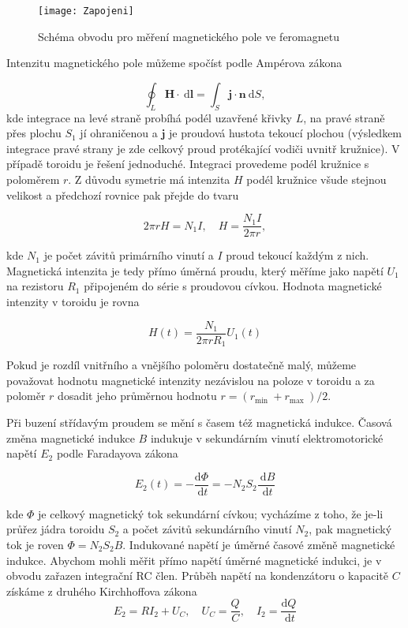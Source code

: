 \documentclass[czech,11pt,a4paper]{article}
\begin{document}
\begin{multicols}{2}
\begin{figure}[H]
\begin{center}
			\texttt{[image: Zapojeni]} 
			\caption{Schéma obvodu pro měření magnetického pole ve feromagnetu}\end{center}		
	\end{figure} 
	Intenzitu magnetického pole můžeme spočíst podle Ampérova zákona
	
\begin{equation}
		\oint_{L} \boldsymbol{H} \cdot \mathrm{~d} \boldsymbol{l}=\int_{S} \boldsymbol{j} \cdot \boldsymbol{n} \mathrm{~d} S,
\end{equation}
	kde integrace na levé straně probíhá podél uzavřené křivky $L$, na pravé straně přes plochu $S_{1}$ jí ohraničenou a $\boldsymbol{j}$ je proudová hustota tekoucí plochou (výsledkem integrace pravé strany je zde celkový proud protékající vodiči uvnitř kružnice). V případě toroidu je řešení jednoduché. Integraci provedeme podél kružnice s poloměrem $r$.
	Z důvodu symetrie má intenzita $H$ podél kružnice všude stejnou velikost a předchozí rovnice pak přejde do tvaru
	
\begin{equation}
		2 \pi r H=N_{1} I, \quad H=\frac{N_{1} I}{2 \pi r},
\end{equation}
	
	kde $N_{1}$ je počet závitů primárního vinutí a $I$ proud tekoucí každým z nich. Magnetická intenzita je tedy přímo úměrná proudu, který měříme jako napětí $U_{1}$ na rezistoru $R_{1}$ připojeném do série s proudovou cívkou. Hodnota magnetické intenzity v toroidu je rovna
	
\begin{equation}
		H(t)=\frac{N_{1}}{2 \pi r R_{1}} U_{1}(t)
\end{equation}
	
	
	Pokud je rozdíl vnitřního a vnějšího poloměru dostatečně malý, můžeme považovat hodnotu magnetické intenzity nezávislou na poloze v toroidu a za poloměr $r$ dosadit jeho průměrnou hodnotu $r=\left(r_{\text {min }}+r_{\text {max }}\right) / 2$.
	
	Při buzení střídavým proudem se mění s časem též magnetická indukce. Časová změna magnetické indukce $B$ indukuje v sekundárním vinutí elektromotorické napětí $E_{2}$ podle Faradayova zákona
	
\begin{equation}
		E_{2}(t)=-\frac{\mathrm{d} \Phi}{\mathrm{~d} t}=-N_{2} S_{2} \frac{\mathrm{~d} B}{\mathrm{~d} t}
\end{equation}
	
	kde $\Phi$ je celkový magnetický tok sekundární cívkou; vycházíme z toho, že je-li průřez jádra toroidu $S_{2}$ a počet závitů sekundárního vinutí $N_{2}$, pak magnetický tok je roven $\Phi=N_{2} S_{2} B$. Indukované napětí je úměrné časové změně magnetické indukce. Abychom mohli měřit přímo napětí úměrné magnetické indukci, je v obvodu zařazen integrační RC člen. Průběh napětí na kondenzátoru o kapacitě $C$ získáme z druhého Kirchhoffova zákona
\begin{equation}
		E_{2}=R I_{2}+U_{C}, \quad U_{C}=\frac{Q}{C}, \quad I_{2}=\frac{\mathrm{d} Q}{\mathrm{~d} t}
\end{equation}
	

\end{multicols}
\end{document}
